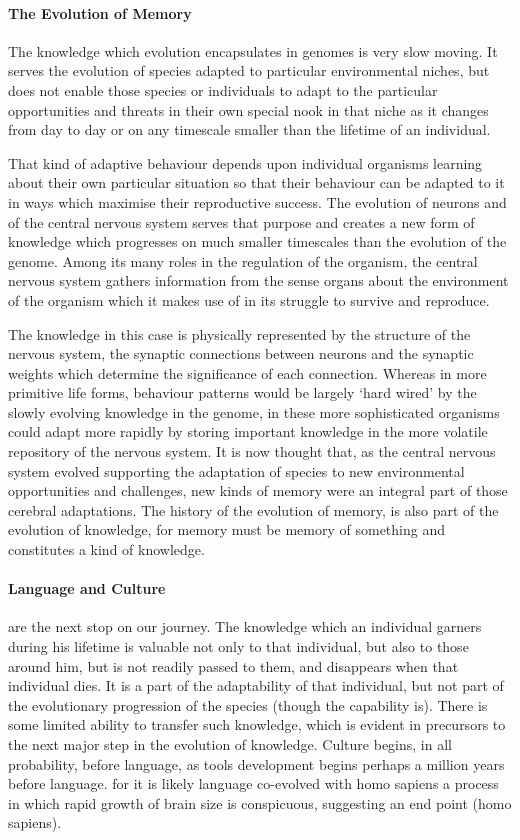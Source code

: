 \documentclass[10pt,titlepage]{book}
\begin{document}
\paragraph{The Evolution of Memory}
The knowledge which evolution encapsulates in genomes is very slow moving.
It serves the evolution of species adapted to particular environmental niches, but does not enable those species or individuals to adapt to the particular opportunities and threats in their own special nook in that niche as it changes from day to day or on any timescale smaller than the lifetime of an individual.

That kind of adaptive behaviour depends upon individual organisms learning about their own particular situation so that their behaviour can be adapted to it in ways which maximise their reproductive success.
The evolution of neurons and of the central nervous system serves that purpose and creates a new form of knowledge which progresses on much smaller timescales than the evolution of the genome.
Among its many roles in the regulation of the organism, the central nervous system gathers information from the sense organs about the environment of the organism which it makes use of in its struggle to survive and reproduce.

The knowledge in this case is physically represented by the structure of the nervous system, the synaptic connections between neurons and the synaptic weights which determine the significance of each connection.
Whereas in more primitive life forms, behaviour patterns would be largely `hard wired' by the slowly evolving knowledge in the genome, in these more sophisticated organisms could adapt more rapidly by storing important knowledge in the more volatile repository of the nervous system.
It is now thought that, as the central nervous system evolved supporting the adaptation of species to new environmental opportunities and challenges, new kinds of memory were an integral part of those cerebral adaptations.
The history of the evolution of memory, is also part of the evolution of knowledge, for memory must be memory of something and constitutes a kind of knowledge.

\paragraph{Language and Culture} are the next stop on our journey.
The knowledge which an individual garners during his lifetime is valuable not only to that individual, but also to those around him, but is not readily passed to them, and disappears when that individual dies.
It is a part of the adaptability of that individual, but not part of the evolutionary progression of the species (though the capability is).
There is some limited ability to transfer such knowledge, which is evident in precursors to the next major step in the evolution of knowledge.
Culture begins, in all probability, before language, as tools development begins perhaps a million years before language.
for it is likely language co-evolved with homo sapiens a process in which rapid growth of brain size is conspicuous, suggesting an end point (homo sapiens).
\end{document}
